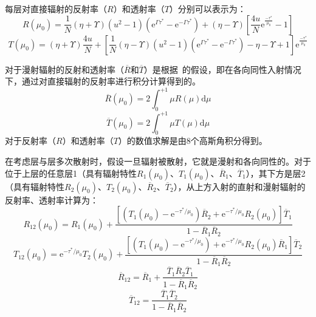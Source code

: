 每层对直接辐射的反射率（$R$）和透射率（$T$）分别可以表示为：
\begin{equation}
  R\left( \mu_{0} \right) = \frac{1}{N}(\eta + \Upsilon)\left( u^{2} - 1 \right)\left( {\mathrm e}^{\Gamma\tau^{*}} - {\mathrm e}^{- \Gamma\tau^{*}} \right) + (\eta - \Upsilon)\left\lbrack \frac{4u}{N}{\mathrm e}^{\frac{- \tau^{*}}{\mu_{0}}} - 1 \right\rbrack
\end{equation}
\begin{equation}
  T\left( \mu_{0} \right) = (\eta + \Upsilon)\frac{4u}{N} + \left\lbrack \frac{1}{N}(\eta - \Upsilon)\left( u^{2} - 1 \right)\left( {\mathrm e}^{\Gamma\tau^{*}} - {\mathrm e}^{- \Gamma\tau^{*}} \right) - \eta - \Upsilon + 1 \right\rbrack {\mathrm e}^{\frac{- \tau^{*}}{\mu_{0}}}
\end{equation}

对于漫射辐射的反射和透射率（\(\overline{R}\)和\(\overline{T}\)）是根据~\citet{wiscombe1980ModelSpectralAlbedo}的假设，即在各向同性入射情况下，通过对直接辐射的反射率进行积分计算得到的。
%
\begin{equation}
  \overline{R}\left( \mu_{0} \right) = 2\int_{0}^{+ 1}{\mu R(\mu){\mathrm d}\mu}
\end{equation}
\begin{equation}
  \overline{T}\left( \mu_{0} \right) = 2\int_{0}^{+ 1}{\mu T(\mu){\mathrm d}\mu}
\end{equation}
%
对于反射率（$R$）和透射率（$T$）的数值求解是由8个高斯角积分得到。

在考虑层与层多次散射时，假设一旦辐射被散射，它就是漫射和各向同性的。对于位于上层的任意层1（具有辐射特性\(R_{1}\left( \mu_{0} \right)\)、\(T_{1}\left( \mu_{0} \right)\)、\({\overline{R}}_{1}\)、\({\overline{T}}_{1}\)），其下方是层2（具有辐射特性\(R_{2}\left( \mu_{0} \right)\)、\(T_{2}\left( \mu_{0} \right)\)、\({\overline{R}}_{2}\)、\({\overline{T}}_{2}\)），从上方入射的直射和漫射辐射的反射率、透射率计算为\citep{briegleb2007delta}：
\begin{equation}
  R_{12}\left( \mu_{0} \right) = R_{1}\left( \mu_{0} \right) + \frac{\left\lbrack \left( T_{1}\left( \mu_{0} \right) - {\mathrm e}^{- \tau^{*}/\mu_{0}} \right){\overline{R}}_{2} + {\mathrm e}^{- \tau^{*}/\mu_{0}}R_{2}\left( \mu_{0} \right) \right\rbrack{\overline{T}}_{1}}{1 - {\overline{R}}_{1}{\overline{R}}_{2}}
\end{equation}
\begin{equation}
  T_{12}\left( \mu_{0} \right) = {{\mathrm e}^{- \tau^{*}/\mu_{0}}T}_{2}\left( \mu_{0} \right) + \frac{\left\lbrack \left( T_{1}\left( \mu_{0} \right) - {\mathrm e}^{- \tau^{*}/\mu_{0}} \right) + {\mathrm e}^{- \tau^{*}/\mu_{0}}R_{2}\left( \mu_{0} \right){\overline{R}}_{1} \right\rbrack{\overline{T}}_{2}}{1 - {\overline{R}}_{1}{\overline{R}}_{2}}
\end{equation}
\begin{equation}
  {\overline{R}}_{12} = {\overline{R}}_{1} + \frac{{\overline{T}}_{1}{\overline{R}}_{2}{\overline{T}}_{1}}{1 - {\overline{R}}_{1}{\overline{R}}_{2}}
\end{equation}
\begin{equation}
  {\overline{T}}_{12} = \frac{{\overline{T}}_{1}{\overline{T}}_{2}}{1 - {\overline{R}}_{1}{\overline{R}}_{2}}
\end{equation}


